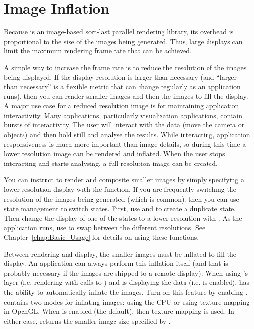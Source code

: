 


\section{Image Inflation}
\label{sec:Customizing_Compositing:Image_Inflation}

Because \IceT is an image-based sort-last parallel
rendering library, its overhead is proportional to the size of the images
being generated.  Thus, large displays can limit the maximum rendering
frame rate that can be achieved.

A simple way to increase the frame rate is to reduce the resolution of the
images being displayed.  If the display resolution is larger than necessary
(and ``larger than necessary'' is a flexible metric that can change
regularly as an application runs), then you can render smaller images and
then  the images to fill the display.  A major use case
for a reduced resolution image is for maintaining application
interactivity.  Many applications, particularly visualization applications,
contain bursts of interactivity.  The user will interact with the data
(move the camera or objects) and then hold still and analyse the results.
While interacting, application responsiveness is much more important than
image details, so during this time a lower resolution image can be rendered
and inflated.  When the user stops interacting and starts analysing, a full
resolution image can be created.

You can instruct \IceT to render and composite smaller images by simply
specifying a lower resolution display with the 
function.  If you are frequently switching the resolution of the images
being generated (which is common), then you can use \IceT state management
to switch states.  First, use  and
 to create a duplicate state.  Then change the display
of one of the states to a lower resolution with .  As
the application runs, use  to swap between the
different resolutions.  See Chapter~\ref{chap:Basic_Usage} for details on
using these functions.

Between rendering and display, the smaller images must be inflated to fill
the display.  An application can always perform this inflation itself (and
that is probably necessary if the images are shipped to a remote display).
When using \IceT's \OpenGL layer (i.e. rendering with calls to
) and \IceT is displaying the data
(i.e.  is enabled), \IceT has the ability to
automatically inflate the images.  Turn on this feature by enabling
.  \IceT contains two modes for inflating
images: using the CPU or using texture mapping in OpenGL.  When
 is enabled (the
default), then texture mapping is used.  In either case,
 returns the smaller image size specified by
.

